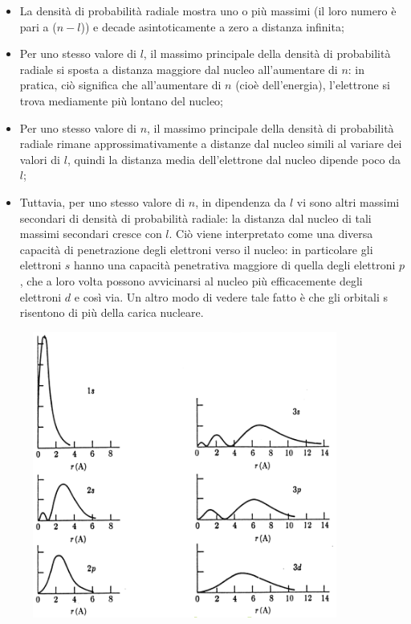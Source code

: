 \begin{itemize}
  \item La densità di probabilità radiale mostra uno o più massimi (il loro numero è pari a ($n-l$)) e decade asintoticamente a zero a distanza infinita;
  \item Per uno stesso valore di $l$, il massimo principale della densità di probabilità radiale si sposta a distanza maggiore dal nucleo all'aumentare di $n$: in pratica, ciò significa che all'aumentare di $n$ (cioè dell'energia), l'elettrone si trova mediamente più lontano del nucleo;
  \item Per uno stesso valore di $n$, il massimo principale della densità di probabilità radiale rimane approssimativamente a distanze dal nucleo simili al variare dei valori di $l$, quindi la distanza media dell'elettrone dal nucleo dipende poco da $l$;
  \item Tuttavia, per uno stesso valore di $n$, in dipendenza da $l$ vi sono altri massimi secondari di densità di probabilità radiale: la distanza dal nucleo di tali massimi secondari cresce con $l$. Ciò viene interpretato come una diversa capacità di penetrazione degli elettroni verso il nucleo: in particolare gli elettroni $s$ hanno una capacità penetrativa maggiore di quella degli elettroni $p$, che a loro volta possono avvicinarsi al nucleo più efficacemente degli elettroni $d$ e così via. Un altro modo di vedere tale fatto è che gli orbitali s risentono di più della carica nucleare.
\end{itemize}

\begin{figure}[htp]
  \centering
  \includegraphics[width=10cm]{immagini/picchi.png}
\end{figure}

